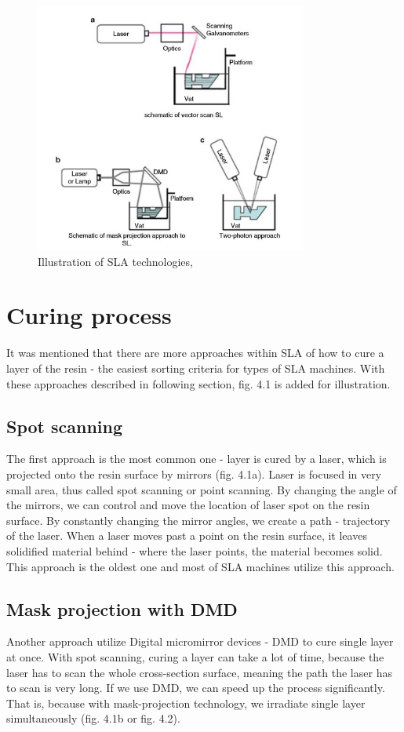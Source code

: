 \documentclass[a4paper, twoside, 11pt]{report}
\begin{document}
\begin{figure}[t]
  \centering
  \includegraphics[width=0.8\textwidth]{SLAillustration}
  \caption{Illustration of SLA technologies, \cite[p. 65]{AMT}}
\end{figure}
%
\section{Curing process} 
It was mentioned that there are more approaches within SLA of how to cure a layer of the resin - the easiest sorting criteria for types of SLA machines. With these approaches described in following section, fig. 4.1 is added for illustration.
\subsection{Spot scanning}
The first approach is the most common one - layer is cured by a laser, which is projected onto the resin surface by mirrors (fig. 4.1a). Laser is focused in very small area, thus called spot scanning or point scanning. By changing the angle of the mirrors, we can control and move the location of laser spot on the resin surface. By constantly changing the mirror angles, we create a path - trajectory of the laser. When a laser moves past a point on the resin surface, it leaves solidified material behind - where the laser points, the material becomes solid. This approach is the oldest one and most of SLA machines utilize this approach.
\subsection{Mask projection with DMD}
Another approach utilize Digital micromirror devices - DMD to cure single layer at once. With spot scanning, curing a layer can take a lot of time, because the laser has to scan the whole cross-section surface, meaning the path the laser has to scan is very long. If we use DMD, we can speed up the process significantly. That is, because with mask-projection technology, we irradiate single layer simultaneously (fig. 4.1b or fig. 4.2).
\end{document}
